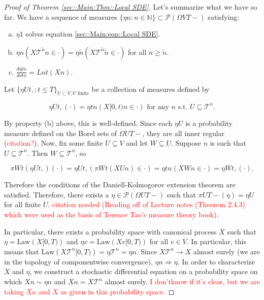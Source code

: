 \documentclass[12pt]{article}
\newcommand{\mb}{\mathbb}
\newcommand{\mc}{\mathcal}
\newcommand{\ms}{\mathscr}
\newcommand{\ra}{\rightarrow}
\newcommand{\te}{\text}
\newcommand{\tr}{\textcolor{red}}
\newcommand{\ind}{\hspace{24pt}}
\newcommand{\pmsr}{\mc{P}}							%
\renewcommand{\v}{v}							%
\renewcommand{\U}{U}							%
\newcommand{\UU}{W}								%
\newcommand{\T}{T}								%
\renewcommand{\t}{t}							%
\newcommand{\proj}{\pi}							%
\renewcommand{\tt}{s}							%
\newcommand{\X}{X}								%
\newcommand{\tree}{\mc{T}}						%
\newcommand{\sln}[1]{^{#1}}						%
\newcommand{\alt}[1]{\widetilde{#1}}			%
\newcommand{\mm}{\nu}							%
\newcommand{\mmm}{\eta}							%
\newcommand{\law}{\te{Law}}						%
\newcommand{\dense}{L}							%
\begin{document}
\begin{proof}[Proof of Theorem \ref{sec::Main:Thm::Local SDE}]
\ind Let's summarize what we have so far. We have a sequence of measures \(\{\mmm{}{}{n}:n\in\mb{N}\} \subset \pmsr(\Omega{V}{\T-})\) satisfying:

\begin{enumerate}[(a)]
\item \(\mmm{}{}{1}\) solves equation \eqref{sec::Main:eqn::Local SDE}.

\item \(\mmm{}{}{n}(\X{\tree\sln{\alt{n}}}{}{n} \in \cdot) = \mmm{}{}{\alt{n}}(\X{\tree\sln{\alt{n}}}{}{\alt{n}}\in \cdot)\) for all \(n \geq \alt{n}\).

\item \(\frac{d\mmm{}{\t}{n}}{d\mm{}{\t}{n}} = \dense{n}{\t}(\X{}{}{n})\).
\end{enumerate}

Let \(\{\mmm{\U}{\t,}{}:\t \leq \T\}_{\U\subset V,\U\te{ finite}}\) be a collection of measures defined by

\[\mmm{\U}{\t,}{}(\cdot) = \mmm{}{\t}{n}(\X{}{[0,\t)}{n} \in \cdot) \te{ for any }n\te{ \tt.\t. }\U \subseteq \tree\sln{n}.\]

By property (b) above, this is well-defined. Since each \(\mmm{\U}{}{}\) is a probability measure defined on the Borel sets of \(\Omega{\U}{\T-}\), they are all inner regular (\tr{citation?}). Now, fix some finite \(\U\subseteq V\) and let \(\UU \subseteq \U\). Suppose \(n\) is such that \(\U \subseteq \tree\sln{n}\). Then \(\UU\subseteq \tree\sln{n}\), so

\[\proj{\UU}{\t}(\mmm{\U}{\t,}{})(\cdot) = \mmm{\U}{\t,}{}\left(\proj{\UU}{\t}(\X{\U}{}{n}) \in \cdot\right) = \mmm{}{\t}{n}\left(\X{\UU}{}{n} \in \cdot\right) = \mmm{\UU}{\t,}{}(\cdot).\]

Therefore the conditions of the Daniell-Kolmogorov extension theorem are satisfied. Therefore, there exists a \(\mmm{}{}{}\in \ms{P}(\Omega{\U}{\T-})\) such that \(\proj{\U}{\T-}(\mmm{}{}{}) =\mmm{\U}{}{}\) for all finite \(\U\). \tr{citation needed (Reading off of Lecture notes (Theorem 2.4.3) which were used as the basis of Terence Tao's measure theory book)}.

\ind In particular, there exists a probability space with canonical process \(\X{}{}\) such that \(\mmm{}{}{} = \law(\X{}{[0,\T)})\) and \(\mmm{\v}{}{} = \law(\X{\v}{[0,\T)})\) for all \(\v \in V\). In particular, this means that \(\law(\X{\tree\sln{n}}{[0,\T)}) = \mmm{\tree\sln{n}}{}{} = \mmm{}{}{n}\). Since \(\X{\tree\sln{n}}{} \ra \X{}{}\) almost surely (we are in the topology of componentwise convergence), \(\mmm{}{}{n} \Rightarrow \mmm{}{}{}\). In order to characterize \(\X{}{}\) and \(\mmm{}{}{}\), we construct a stochastic differential equation on a probability space on which \(\X{}{}{n} \sim \mmm{}{}{n}\) and \(\X{}{}{n} = \X{\tree\sln{n}}{}\) almost surely. \tr{I don'\t know if it's clear, but we are taking \(\X{}{}{n}\) and \(\X{}{}\) as given in this probability space.}


\end{proof}
\end{document}
